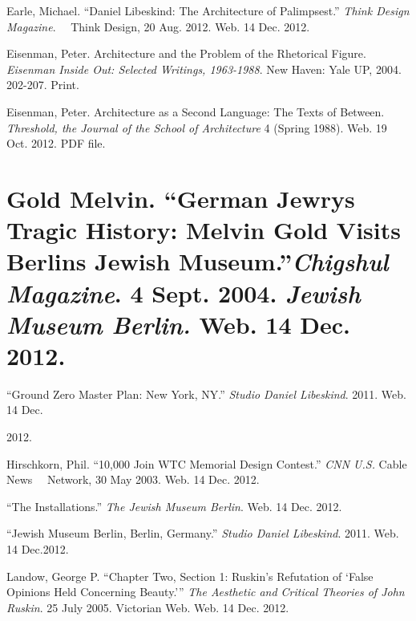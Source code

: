 {\color{black}
Earle, Michael.  “Daniel Libeskind: The Architecture of Palimpsest.” 
\textit{Think Design Magazine}.  \ \ Think Design, 20 Aug. 2012.  Web. 
14 Dec. 2012.  }

{\color{black}
Eisenman, Peter.  {\textquotedbl}Architecture and the Problem of the
Rhetorical Figure.{\textquotedbl}  \textit{Eisenman Inside Out:
Selected Writings, 1963-1988}.  New Haven: Yale UP, 2004.  202-207. 
Print.}

{\color{black}
Eisenman, Peter.  {\textquotedbl}Architecture as a Second Language: The
Texts of Between.{\textquotedbl}  \textit{Threshold, the Journal of the
School of Architecture} 4 (Spring 1988).  Web.  19 Oct. 2012.  PDF
file.}

\section[Gold Melvin. \ “German Jewry{\textquotesingle}s Tragic History:
Melvin Gold Visits Berlin{\textquotesingle}s Jewish Museum.”~
\ Chigshul Magazine. \ 4 Sept. 2004. \ Jewish Museum Berlin. Web. \ 14
Dec. 2012.
\ ]{\textmd{\textcolor[rgb]{0.15294118,0.15294118,0.15294118}{\MakeUppercase{G}}}\textmd{\textcolor[rgb]{0.15294118,0.15294118,0.15294118}{old
Melvin.  “German Jewry{\textquotesingle}s Tragic History: Melvin Gold
Visits Berlin{\textquotesingle}s Jewish
Museum.”}}\textstyleappleconvertedspace{\textmd{\textcolor[rgb]{0.15294118,0.15294118,0.15294118}{~

}}}\textmd{\textit{\textcolor[rgb]{0.15294118,0.15294118,0.15294118}{Chigshul
Magazine}}}\textmd{\textcolor[rgb]{0.15294118,0.15294118,0.15294118}{. 
4 Sept. 2004. 
}}\textmd{\textit{\textcolor[rgb]{0.15294118,0.15294118,0.15294118}{Jewish
Museum
Berlin.}}}\textmd{\textcolor[rgb]{0.15294118,0.15294118,0.15294118}{
Web.  14 Dec. 2012.  }}}
{\color{black}
“Ground Zero Master Plan: New York, NY.”  \textit{Studio Daniel
Libeskind}.  2011.  Web.  14 Dec. }

{\color{black}
2012.  }

{\color{black}
Hirschkorn, Phil.  “10,000 Join WTC Memorial Design Contest.” 
\textit{CNN U.S.}  Cable News \ \ Network, 30 May 2003.  Web.  14 Dec.
2012.  }

{\color{black}
“The Installations.”  \textit{The Jewish Museum Berlin}.  Web.  14 Dec. 
2012.  }

{\color{black}
“Jewish Museum Berlin, Berlin, Germany.”  \textit{Studio Daniel
Libeskind}.  2011.  Web.  14 Dec.2012.  }

{\color{black}
Landow, George P.  “Chapter Two, Section 1: Ruskin’s Refutation of
‘False Opinions Held Concerning Beauty.’”  \textit{The Aesthetic and
Critical Theories of John Ruskin}.  25 July 2005.  Victorian Web.  Web.
 14 Dec. 2012.  }

